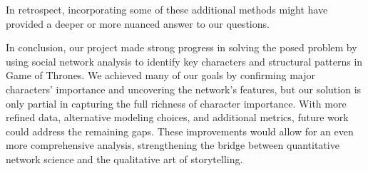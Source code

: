 \documentclass[12pt, a4paper]{article}
\begin{document}
In retrospect, incorporating some of these additional methods might have provided a deeper or more nuanced answer to our questions.

In conclusion, our project made strong progress in solving the posed problem by using social network analysis to identify key characters and structural patterns in Game of Thrones. We achieved many of our goals by confirming major characters’ importance and uncovering the network’s features, but our solution is only partial in capturing the full richness of character importance. With more refined data, alternative modeling choices, and additional metrics, future work could address the remaining gaps. These improvements would allow for an even more comprehensive analysis, strengthening the bridge between quantitative network science and the qualitative art of storytelling.
\end{document}
